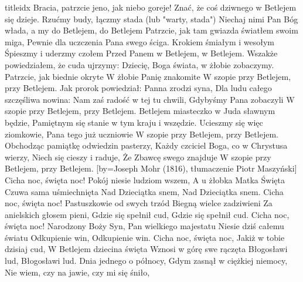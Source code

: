 \documentclass[a5paper, portrait, 12pt]{mwart}
\begin{document}
\begin{songs}{titleidx}
\beginverse
    Bracia, patrzcie jeno, jak niebo goreje!
    Znać, że coś dziwnego w Betlejem się dzieje.
    Rzućmy budy, łączmy stada (lub "warty, stada")
    Niechaj nimi Pan Bóg włada, a my do Betlejem, do Betlejem
\endverse
\beginverse
    Patrzcie, jak tam gwiazda światłem swoim miga,
    Pewnie dla uczczenia Pana swego ściga.
    Krokiem śmiałym i wesołym
    Śpieszmy i uderzmy czołem
    Przed Panem w Betlejem, w Betlejem.
\endverse
\beginverse
    Wszakże powiedziałem, że cuda ujrzymy:
    Dziecię, Boga świata, w żłobie zobaczymy.
    Patrzcie, jak biednie okryte
    W żłobie Panię znakomite
    W szopie przy Betlejem, przy Betlejem.
\endverse
\beginverse
    Jak prorok powiedział: Panna zrodzi syna,
    Dla ludu całego szczęśliwa nowina:
    Nam zaś radość w tej tu chwili,
    Gdybyśmy Pana zobaczyli
    W szopie przy Betlejem, przy Betlejem.
\endverse
\beginverse
    Betlejem miasteczko w Juda sławnym będzie,
    Pamiętnym się stanie w tym kraju i wszędzie.
    Ucieszmy się więc ziomkowie,
    Pana tego już uczniowie
    W szopie przy Betlejem, przy Betlejem.
\endverse
\beginverse
    Obchodząc pamiątkę odwiedzin pasterzy,
    Każdy czciciel Boga, co w Chrystusa wierzy,
    Niech się cieszy i raduje,
    Że Zbawcę swego znajduje
    W szopie przy Betlejem, przy Betlejem.
\endverse
\endsong
[by={Joseph Mohr (1816), tłumaczenie Piotr Maszyński}]
\beginverse
    Cicha noc, święta noc!
    Pokój niesie ludziom wszem,
    A u żłobka Matka Święta
    Czuwa sama uśmiechnięta
    Nad Dzieciątka snem,
    Nad Dzieciątka snem.
\endverse
\beginverse
    Cicha noc, święta noc!
    Pastuszkowie od swych trzód
    Biegną wielce zadziwieni
    Za anielskich głosem pieni,
    Gdzie się spełnił cud,
    Gdzie się spełnił cud.
\endverse
\beginverse
    Cicha noc, święta noc!
    Narodzony Boży Syn,
    Pan wielkiego majestatu
    Niesie dziś całemu światu
    Odkupienie win,
    Odkupienie win.
\endverse
\beginverse
    Cicha noc, święta noc,
    Jakiż w tobie dzisiaj cud,
    W Betlejem dziecina święta
    Wznosi w górę swe rączęta
    Błogosławi lud,
    Błogosławi lud.
\endverse
\endsong
\beginverse
    Dnia jednego o północy,
    Gdym zasnął w ciężkiej niemocy,
\endverse 
  \beginchorus
      Nie wiem, czy na jawie, czy mi się śniło,

\end{songs}
\end{document}
